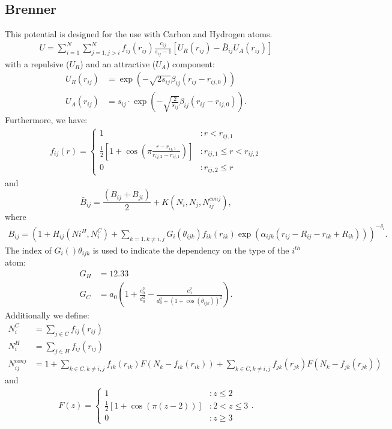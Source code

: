 \subsection{Brenner}
This potential is designed for the use with Carbon and Hydrogen atoms.
\begin{align*}
U =\sum_{i=1}^N \sum_{j=1,j>i}^N f_{ij}(r_{ij})\frac{c_{ij}}{s_{ij}-1}\left[ U_{R}(r_{ij})-\bar{B}_{ij}U_A(r_{ij})\right]
\end{align*}
with a repulsive ($U_R$) and an attractive ($U_A$) component:
\begin{align*}
U_R(r_{ij})&= \exp\left( -\sqrt{2s_{ij}}\beta_{ij}(r_{ij}-r_{ij,0})\right) \\
U_A(r_{ij})&= s_{ij}\cdot \exp\left( -\sqrt{\frac{2}{s_{ij}}}\beta_{ij}(r_{ij}-r_{ij,0})\right).
\end{align*}
Furthermore, we have:
\begin{align*}
f_{ij}(r) = \left\{ \begin{array}{ll} 1 & :r<r_{ij,1}\\\frac{1}{2}\left[ 1+\cos\left(\pi\frac{r-r_{ij,1}}{r_{ij,2}-r_{ij,1}} \right)\right]&:r_{ij,1}\leq r<r_{ij,2}  \\0&: r_{ij,2}\leq r \end{array}\right.
\end{align*}
and
\begin{equation*}
\bar{B}_{ij}=\frac{(B_{ij}+B_{ji})}{2} + K(N_i, N_j, N_{ij}^{conj}),
\end{equation*}
where
\begin{align*}
B_{ij} = \left( 1+H_{ij}(Ni^H,N_i^C)+\sum_{k=1, k\neq i,j}G_i(\theta_{ijk})f_{ik}(r_{ik}) \exp\left( \alpha_{ijk}(r_{ij}-R_{ij}-r_{ik}+R_{ik})\right)  \right)^{-\delta_i}.
\end{align*}
The index of $G_i()\theta_{ijk}$ is used to indicate the dependency on the type of the $i^{th}$ atom:
\begin{align*}
G_{H} &= 12.33\\
G_{C} &= a_0 \left( 1+\frac{c_0^2}{d_0^2} - \frac{c_0^2}{d_0^2 +(1+\cos(\theta_{ijk}))^2 }\right).
\end{align*}
Additionally we define:
\begin{align*}
N_i^C &= \sum_{j \in C} f_{ij}(r_{ij})\\
N_i^H &= \sum_{j \in H} f_{ij}(r_{ij})\\
N_{ij}^{conj} &= 1+\sum_{k \in C, k\neq i,j} f_{ik}(r_{ik})F(N_k-f_{ik}(r_{ik}))+\sum_{k \in C, k\neq i,j} f_{jk}(r_{jk})F(N_k-f_{jk}(r_{jk}))
\end{align*}
and
\begin{align*}
F(z)=\left\{ \begin{array}{ll} 1&:z \leq 2\\ \frac{1}{2} \left[ 1+\cos( \pi(z-2)) \right]&:2<z\leq 3\\ 0&:z\geq 3\end{array} \right. .
\end{align*}


